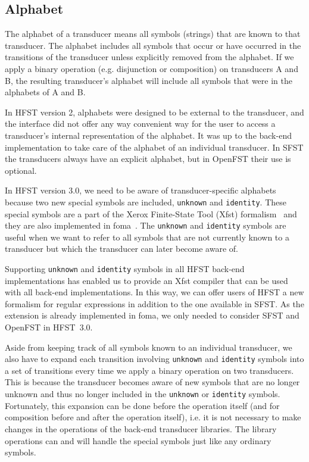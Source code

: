 \documentclass{llncs}
\begin{document}
\subsection{Alphabet}
The alphabet of a transducer means all symbols (strings) that are
known to that transducer. The alphabet includes all symbols that occur 
or have occurred in the transitions of the transducer unless explicitly
removed from the alphabet. 
If we apply a binary operation (e.g. disjunction or composition) on 
transducers A and B, the resulting transducer's alphabet will include
all symbols that were in the alphabets of A and B. 

In HFST version 2, alphabets were designed to be external to the transducer,
and the interface did not offer any way convenient way for the user to access a 
transducer's internal representation of the alphabet. It was up to the back-end 
implementation to take care of the alphabet of an individual transducer. In SFST 
the transducers always have an explicit alphabet, but in OpenFST their use is optional.
 
In HFST version 3.0, we need to be aware of transducer-specific alphabets 
because two new special symbols are included, \texttt{unknown} and \texttt{identity}. 
These special symbols are a part of the Xerox Finite-State Tool (Xfst) 
formalism~\cite{beesley/2003} and they are also implemented in
foma~\cite{hulden/2009}. The \texttt{unknown} and \texttt{identity} symbols 
are useful when we want to refer to all symbols that are not currently 
known to a transducer but which the transducer can later become aware of. 

Supporting \texttt{unknown} and \texttt{identity} symbols in all HFST back-end
implementations has enabled us to provide an Xfst compiler that can be used
with all back-end implementations. 
In this way, we can offer users of HFST a new 
formalism for regular expressions in addition to the one available in SFST. 
As the extension is already implemented in foma, we only needed to 
consider SFST and OpenFST in HFST~3.0.

Aside from keeping track of all symbols known to an individual transducer, we also
have to expand each transition involving \texttt{unknown} and 
\texttt{identity} symbols into a set of transitions every time we apply 
a binary operation on two transducers. 
This is because the transducer becomes aware of new symbols that are
no longer unknown and thus no longer included in the \texttt{unknown} or 
\texttt{identity} symbols.
Fortunately, this expansion can be done before the operation itself 
(and for composition before and after the operation itself), i.e. it is  
not necessary to make changes in the operations of the back-end transducer
libraries. 
The library operations can and will handle the special symbols just
like any ordinary symbols. 
\end{document}
